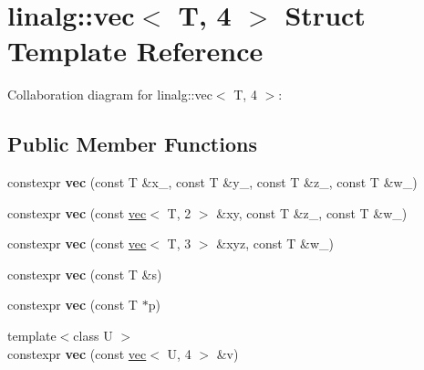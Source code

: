 \hypertarget{structlinalg_1_1vec_3_01T_00_014_01_4}{}\section{linalg\+:\+:vec$<$ T, 4 $>$ Struct Template Reference}
\label{structlinalg_1_1vec_3_01T_00_014_01_4}


Collaboration diagram for linalg\+:\+:vec$<$ T, 4 $>$\+:
\subsection*{Public Member Functions}
\begin{DoxyCompactItemize}
\item 
constexpr {\bfseries vec} (const T \&x\+\_\+, const T \&y\+\_\+, const T \&z\+\_\+, const T \&w\+\_\+)\hypertarget{structlinalg_1_1vec_3_01T_00_014_01_4_a1384f960ade58a1eaa110411da5e66e2}{}\label{structlinalg_1_1vec_3_01T_00_014_01_4_a1384f960ade58a1eaa110411da5e66e2}

\item 
constexpr {\bfseries vec} (const \hyperlink{structlinalg_1_1vec}{vec}$<$ T, 2 $>$ \&xy, const T \&z\+\_\+, const T \&w\+\_\+)\hypertarget{structlinalg_1_1vec_3_01T_00_014_01_4_ab9a41f08fc740b65dd719976ab61ebc4}{}\label{structlinalg_1_1vec_3_01T_00_014_01_4_ab9a41f08fc740b65dd719976ab61ebc4}

\item 
constexpr {\bfseries vec} (const \hyperlink{structlinalg_1_1vec}{vec}$<$ T, 3 $>$ \&xyz, const T \&w\+\_\+)\hypertarget{structlinalg_1_1vec_3_01T_00_014_01_4_ae02054a25afe824f76be07ad4e07401f}{}\label{structlinalg_1_1vec_3_01T_00_014_01_4_ae02054a25afe824f76be07ad4e07401f}

\item 
constexpr {\bfseries vec} (const T \&s)\hypertarget{structlinalg_1_1vec_3_01T_00_014_01_4_afaa60d9eb56714aeb89a8a71064d6cc5}{}\label{structlinalg_1_1vec_3_01T_00_014_01_4_afaa60d9eb56714aeb89a8a71064d6cc5}

\item 
constexpr {\bfseries vec} (const T $\ast$p)\hypertarget{structlinalg_1_1vec_3_01T_00_014_01_4_a696635cdedadf67315ef9184edb00ef4}{}\label{structlinalg_1_1vec_3_01T_00_014_01_4_a696635cdedadf67315ef9184edb00ef4}

\item 
{\footnotesize template$<$class U $>$ }\\constexpr {\bfseries vec} (const \hyperlink{structlinalg_1_1vec}{vec}$<$ U, 4 $>$ \&v)\hypertarget{structlinalg_1_1vec_3_01T_00_014_01_4_abb8a97f384c71044ea5528d400c18a03}{}\label{structlinalg_1_1vec_3_01T_00_014_01_4_abb8a97f384c71044ea5528d400c18a03}


\end{DoxyCompactItemize}
